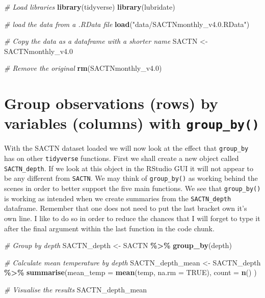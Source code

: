 \documentclass[
]{book}
\newenvironment{Shaded}{\begin{snugshade}}{\end{snugshade}}
\newcommand{\CommentTok}[1]{\textcolor[rgb]{0.56,0.35,0.01}{\textit{#1}}}
\newcommand{\DataTypeTok}[1]{\textcolor[rgb]{0.13,0.29,0.53}{#1}}
\newcommand{\FloatTok}[1]{\textcolor[rgb]{0.00,0.00,0.81}{#1}}
\newcommand{\KeywordTok}[1]{\textcolor[rgb]{0.13,0.29,0.53}{\textbf{#1}}}
\newcommand{\NormalTok}[1]{#1}
\newcommand{\OperatorTok}[1]{\textcolor[rgb]{0.81,0.36,0.00}{\textbf{#1}}}
\newcommand{\OtherTok}[1]{\textcolor[rgb]{0.56,0.35,0.01}{#1}}
\newcommand{\StringTok}[1]{\textcolor[rgb]{0.31,0.60,0.02}{#1}}
\begin{document}
\begin{Shaded}
\begin{Highlighting}[]
\CommentTok{\# Load libraries}
\KeywordTok{library}\NormalTok{(tidyverse)}
\KeywordTok{library}\NormalTok{(lubridate)}

\CommentTok{\# load the data from a .RData file}
\KeywordTok{load}\NormalTok{(}\StringTok{"data/SACTNmonthly\_v4.0.RData"}\NormalTok{)}

\CommentTok{\# Copy the data as a dataframe with a shorter name}
\NormalTok{SACTN <{-}}\StringTok{ }\NormalTok{SACTNmonthly\_v4}\FloatTok{.0}

\CommentTok{\# Remove the original}
\KeywordTok{rm}\NormalTok{(SACTNmonthly\_v4}\FloatTok{.0}\NormalTok{)}
\end{Highlighting}
\end{Shaded}

\hypertarget{group-observations-rows-by-variables-columns-with-group_by}{%
\section{\texorpdfstring{Group observations (rows) by variables (columns) with \texttt{group\_by()}}{Group observations (rows) by variables (columns) with group\_by()}}\label{group-observations-rows-by-variables-columns-with-group_by}}

With the SACTN dataset loaded we will now look at the effect that \texttt{group\_by} has on other \texttt{tidyverse} functions. First we shall create a new object called \texttt{SACTN\_depth}. If we look at this object in the RStudio GUI it will not appear to be any different from \texttt{SACTN}. We may think of \texttt{group\_by()} as working behind the scenes in order to better support the five main functions. We see that \texttt{group\_by()} is working as intended when we create summaries from the \texttt{SACTN\_depth} dataframe. Remember that one does not need to put the last bracket own it's own line. I like to do so in order to reduce the chances that I will forget to type it after the final argument within the last function in the code chunk.

\begin{Shaded}
\begin{Highlighting}[]
\CommentTok{\# Group by depth}
\NormalTok{SACTN\_depth <{-}}\StringTok{ }\NormalTok{SACTN }\OperatorTok{\%>\%}\StringTok{ }
\StringTok{  }\KeywordTok{group\_by}\NormalTok{(depth)}

\CommentTok{\# Calculate mean temperature by depth}
\NormalTok{SACTN\_depth\_mean <{-}}\StringTok{ }\NormalTok{SACTN\_depth }\OperatorTok{\%>\%}\StringTok{ }
\StringTok{  }\KeywordTok{summarise}\NormalTok{(}\DataTypeTok{mean\_temp =} \KeywordTok{mean}\NormalTok{(temp, }\DataTypeTok{na.rm =} \OtherTok{TRUE}\NormalTok{),}
  \DataTypeTok{count =} \KeywordTok{n}\NormalTok{()}
\NormalTok{)}

\CommentTok{\# Visualise the results}
\NormalTok{SACTN\_depth\_mean}
\end{Highlighting}
\end{Shaded}
\end{document}
